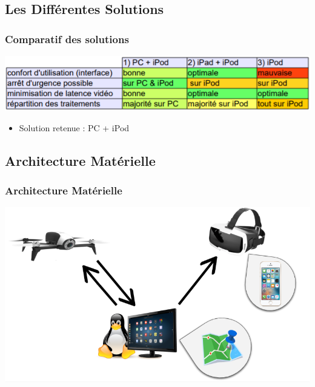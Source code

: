 \documentclass{beamer}
\begin{document}

	\begin{frame}
		\section{Les Différentes Solutions}
		\begin{center}
		\frametitle{Comparatif des solutions}
       
        \includegraphics[scale=0.9]{comparatif_v3.PNG}
        \begin{itemize}
            \item Solution retenue : PC + iPod\\
        \end{itemize}
		\end{center}
	\end{frame}
	

	\begin{frame}
		\section{Architecture Matérielle}
		\begin{center}
		\frametitle{Architecture Matérielle}
       
        \includegraphics[scale=0.6]{schema_archi.png}
		\end{center}
	\end{frame}
	
\end{document}
